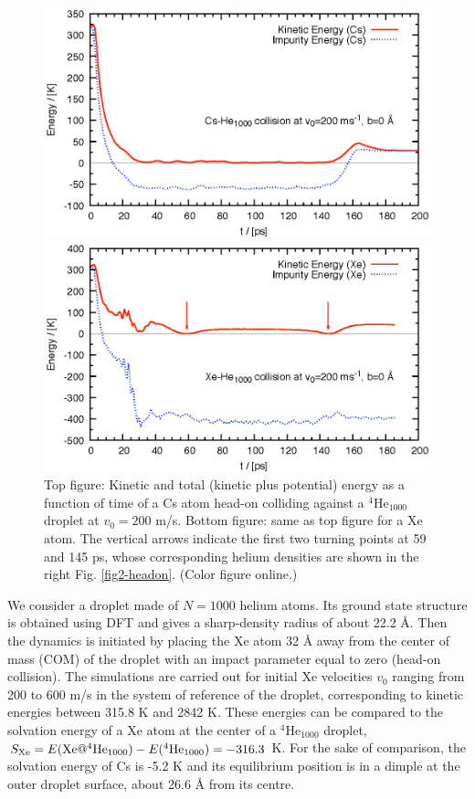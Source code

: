 		\begin{figure}[!]
			\centerline{\includegraphics[width=0.90\linewidth,clip]{fig3-Cs-He}} 
			\centerline{\includegraphics[width=0.90\linewidth,clip]{fig3-Xe-He}}
			\caption{\label{fig3-headon}Top figure: Kinetic and total (kinetic plus potential) energy as a function of time  of a Cs atom head-on colliding against a  $^4$He$_{1000}$ droplet at  $v_0 = 200$ m/s. Bottom figure: same as top figure for a Xe atom. The vertical arrows indicate the first two turning points at 59 and 145 ps, whose corresponding helium densities are shown in the right Fig. \ref{fig2-headon}. (Color figure online.)}
		\end{figure}

		We consider a droplet made of $N=1000$ helium atoms. Its ground state structure is obtained using DFT and gives a sharp-density  radius of about 22.2 \AA{}. Then the dynamics is initiated by placing the Xe atom 32 \AA{} away from the center of mass (COM) of the droplet with an impact parameter equal to zero (head-on collision). The simulations are carried out for initial Xe velocities  $v_0$ ranging from 200 to  600 m/s in the system of reference of the droplet, corresponding to kinetic energies between  315.8 K and  2842 K. These energies can be compared to the solvation energy of a Xe atom at the center of a $^4$He$_{1000}$ droplet, $S_{{\rm Xe}} = E({\rm Xe}@^4{\rm He}_{1000}) - E(^4{\rm He}_{1000}) = -316.3$ K. For the sake of comparison, the solvation energy of Cs is -5.2 K and its equilibrium position is  in a dimple at the outer droplet surface, about 26.6 \AA{} from its centre. 

